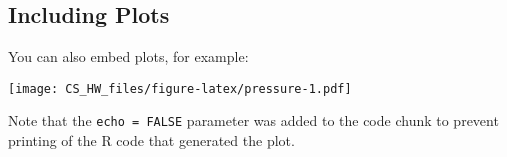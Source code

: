 \documentclass[
]{article}
\begin{document}
\subsection{Including Plots}\label{including-plots}

You can also embed plots, for example:

\texttt{[image: CS\_HW\_files/figure-latex/pressure-1.pdf]}

Note that the \texttt{echo\ =\ FALSE} parameter was added to the code
chunk to prevent printing of the R code that generated the plot.
\end{document}

